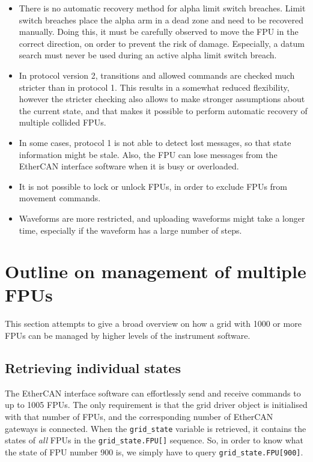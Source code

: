 \documentclass[11pt,a4paper]{scrartcl}
\begin{document}
\begin{itemize}
\item There is no automatic recovery method for alpha limit switch
  breaches. Limit switch breaches place the alpha arm in a dead zone
  and need to be recovered manually. Doing this, it must be carefully
  observed to move the FPU in the correct direction, on order to
  prevent the risk of damage. Especially, a datum search must never be
  used during an active alpha limit switch breach.

\item In protocol version 2, transitions and allowed commands are
  checked much stricter than in protocol 1.  This results in a
  somewhat reduced flexibility, however the stricter checking also
  allows to make stronger assumptions about the current state, and
  that makes it possible to perform automatic recovery of multiple
  collided FPUs.
  
\item In some cases, protocol 1 is not able to detect lost messages,
  so that state information might be stale. Also, the FPU can lose
  messages from the EtherCAN interface software when it is busy or overloaded. 
  

\item It is not possible to lock or unlock FPUs, in order to exclude
  FPUs from movement commands.
  
\item Waveforms are more restricted, and uploading waveforms might
  take a longer time, especially if the waveform has a large number of
  steps.
  
\end{itemize}

\section{Outline on management of multiple FPUs}
\label{sec:multifpu}
This section attempts to give a broad overview on how a grid with 1000
or more FPUs can be managed by higher levels of the instrument
software.

\subsection{Retrieving individual states}
The EtherCAN interface software can effortlessly send and receive commands to up
to 1005 FPUs. The only requirement is that the grid driver object is
initialised with that number of FPUs, and the corresponding number of
EtherCAN gateways is connected. When the \texttt{grid\_state} variable
is retrieved, it contains the states of \emph{all} FPUs in the
\verb+grid_state.FPU[]+ sequence. So, in order to know what the state
of FPU number 900 is, we simply have to query
\verb+grid_state.FPU[900]+.
\end{document}
